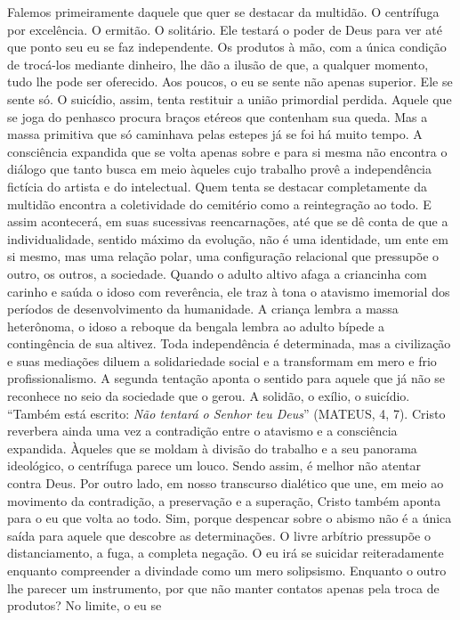 Falemos primeiramente daquele que quer se destacar da multidão. O
centrífuga por excelência. O ermitão. O solitário. Ele testará o poder
de Deus para ver até que ponto seu eu se faz independente. Os produtos à
mão, com a única condição de trocá-los mediante dinheiro, lhe dão a
ilusão de que, a qualquer momento, tudo lhe pode ser oferecido. Aos
poucos, o eu se sente não apenas superior. Ele se sente só. O suicídio,
assim, tenta restituir a união primordial perdida. Aquele que se joga do
penhasco procura braços etéreos que contenham sua queda. Mas a massa
primitiva que só caminhava pelas estepes já se foi há muito tempo. A
consciência expandida que se volta apenas sobre e para si mesma não
encontra o diálogo que tanto busca em meio àqueles cujo trabalho provê a
independência fictícia do artista e do intelectual. Quem tenta se
destacar completamente da multidão encontra a coletividade do cemitério
como a reintegração ao todo. E assim acontecerá, em suas sucessivas
reencarnações, até que se dê conta de que a individualidade, sentido
máximo da evolução, não é uma identidade, um ente em si mesmo, mas uma
relação polar, uma configuração relacional que pressupõe o outro, os
outros, a sociedade. Quando o adulto altivo afaga a criancinha com
carinho e saúda o idoso com reverência, ele traz à tona o atavismo
imemorial dos períodos de desenvolvimento da humanidade. A criança
lembra a massa heterônoma, o idoso a reboque da bengala lembra ao adulto
bípede a contingência de sua altivez. Toda independência é determinada,
mas a civilização e suas mediações diluem a solidariedade social e a
transformam em mero e frio profissionalismo. A segunda tentação aponta o
sentido para aquele que já não se reconhece no seio da sociedade que o
gerou. A solidão, o exílio, o suicídio. ``Também está escrito: \emph{Não
tentará o Senhor teu Deus}'' (MATEUS, 4, 7). Cristo reverbera ainda uma
vez a contradição entre o atavismo e a consciência expandida. Àqueles
que se moldam à divisão do trabalho e a seu panorama ideológico, o
centrífuga parece um louco. Sendo assim, é melhor não atentar contra
Deus. Por outro lado, em nosso transcurso dialético que une, em meio ao
movimento da contradição, a preservação e a superação, Cristo também
aponta para o eu que volta ao todo. Sim, porque despencar sobre o abismo
não é a única saída para aquele que descobre as determinações. O livre
arbítrio pressupõe o distanciamento, a fuga, a completa negação. O eu
irá se suicidar reiteradamente enquanto compreender a divindade como um
mero solipsismo. Enquanto o outro lhe parecer um instrumento, por que
não manter contatos apenas pela troca de produtos? No limite, o eu se
